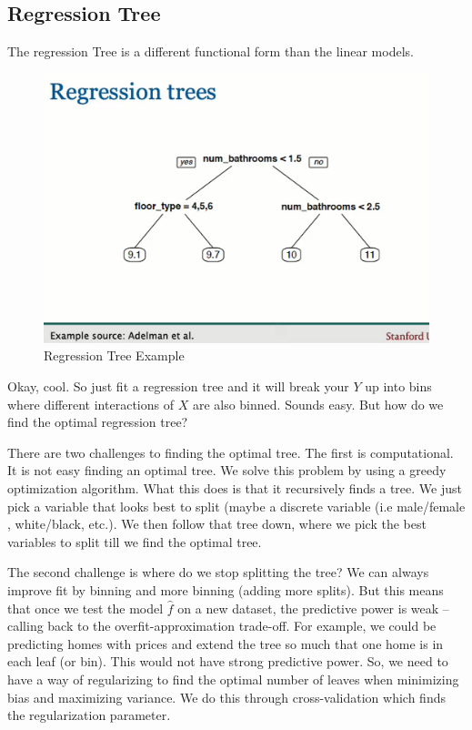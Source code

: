 \documentclass{article}
\begin{document}
\subsection{Regression Tree}

The regression Tree is a different functional form than the linear models.

\begin{figure}[H]
    \centering
    \includegraphics[scale = 0.3]{reg_tree.png}
    \caption{Regression Tree Example}
    \label{fig:my_label}
\end{figure}

Okay, cool. So just fit a regression tree and it will break your $Y$ up into bins where different interactions of $X$ are also binned. Sounds easy. But how do we find the optimal regression tree?

There are two challenges to finding the optimal tree. The first is computational. It is not easy finding an optimal tree. We solve this problem by using a greedy optimization algorithm. What this does is that it recursively finds a tree. We just pick a variable that looks best to split (maybe a discrete variable (i.e male/female , white/black, etc.). We then follow that tree down, where we pick the best variables to split till we find the optimal tree.

The second challenge is where do we stop splitting the tree? We can always improve fit by binning and more binning (adding more splits). But this means that once we test the model $\hat{f}$ on a new dataset, the predictive power is weak -- calling back to the overfit-approximation trade-off. For example, we could be predicting homes with prices and extend the tree so much that one home is in each leaf (or bin). This would not have strong predictive power. So, we need to have a way of regularizing to find the optimal number of leaves when minimizing bias and  maximizing variance. We do this through cross-validation which finds the regularization parameter.
\end{document}
